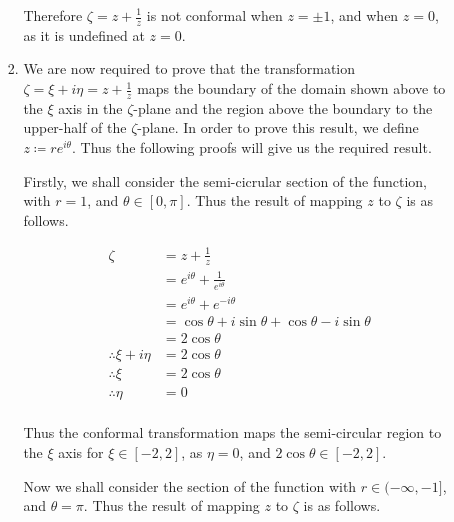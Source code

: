 \documentclass[a4paper]{article}
\begin{document}
\begin{enumerate}[label=\textbf{\arabic*.}]
\begin{enumerate}
\begin{enumerate}
			Therefore $\displaystyle{\zeta = z + \frac{1}{z}}$ is not conformal when $\displaystyle{z=\pm 1}$, and when $\displaystyle{z=0}$, as it is undefined at $\displaystyle{z=0}$.

			\bigbreak

			\item We are now required to prove that the transformation $\displaystyle{\zeta = \xi + i\eta = z + \frac{1}{z}}$ maps the boundary of the domain shown above to the $\displaystyle{\xi}$ axis in the $\displaystyle{\zeta}$-plane and the region above the boundary to the upper-half of the $\displaystyle{\zeta}$-plane. In order to prove this result, we define $\displaystyle{z\coloneqq re^{i\theta}}$. Thus the following proofs will give us the required result.

			\bigbreak

			Firstly, we shall consider the semi-cicrular section of the function, with $\displaystyle{r=1}$, and $\displaystyle{\theta \in [0,\pi]}$. Thus the result of mapping $\displaystyle{z}$ to $\displaystyle{\zeta}$ is as follows.

			\begin{align*}
			\zeta & = z + \frac{1}{z}\\
			& = e^{i\theta} + \frac{1}{e^{i\theta}}\\
			& = e^{i\theta} + e^{-i\theta}\\
			& = \cos\theta + i\sin\theta + \cos\theta - i\sin\theta\\
			& = 2\cos\theta\\
			\therefore \xi + i\eta & = 2\cos\theta\\
			\therefore \xi & = 2\cos\theta\\
			\therefore \eta & = 0\\
			\end{align*}

			Thus the conformal transformation maps the semi-circular region to the $\displaystyle{\xi}$ axis for $\displaystyle{\xi \in [-2,2]}$, as $\displaystyle{\eta = 0}$, and $\displaystyle{2\cos\theta \in [-2,2]}$. 

			\pagebreak

			Now we shall consider the section of the function with $\displaystyle{r \in (-\infty,-1]}$, and $\displaystyle{\theta = \pi}$. Thus the result of mapping $\displaystyle{z}$ to $\displaystyle{\zeta}$ is as follows.


\end{enumerate}
\end{enumerate}
\end{enumerate}
\end{document}
